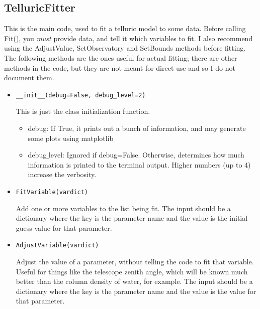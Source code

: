 \documentclass{article}
\begin{document}
\subsection{TelluricFitter}
This is the main code, used to fit a telluric model to some data. Before calling Fit(), you \emph{must} provide data, and tell it which variables to fit. I also recommend using the AdjustValue, SetObservatory and SetBounds methods before fitting. The following methods are the ones useful for actual fitting; there are other methods in the code, but they are not meant for direct use and so I do not document them.


\begin{itemize}

  \item \begin{Verbatim}[commandchars=\\\{\}]
__init__(debug=False, debug_level=2)
    \end{Verbatim}
    This is just the class initialization function.
  
  \begin{itemize}
    \item debug: If True, it prints out a bunch of information, and may generate some plots using matplotlib
    \item debug$\_$level: Ignored if debug=False. Otherwise, determines how much information is printed to the terminal output. Higher numbers (up to 4) increase the verbosity.
  \end{itemize}
  
  
  \item \begin{Verbatim}[commandchars=\\\{\}]
FitVariable(vardict)
    \end{Verbatim}
    Add one or more variables to the list being fit. The input should be a dictionary where the key is the parameter name and the value is the initial guess value for that parameter.
    
  \item \begin{Verbatim}[commandchars=\\\{\}]
AdjustVariable(vardict)
    \end{Verbatim}
    Adjust the value of a parameter, without telling the code to fit that variable. Useful for things like the telescope zenith angle, which will be known much better than the column density of water, for example. The input should be a dictionary where the key is the parameter name and the value is the  value for that parameter.
    

\end{itemize}
\end{document}
